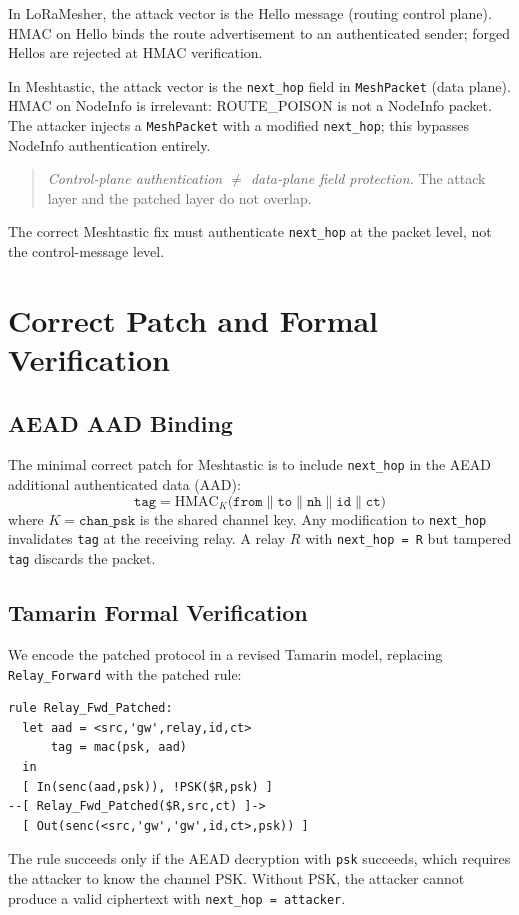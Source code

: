 \documentclass[journal]{IEEEtran}
\begin{document}
In LoRaMesher, the attack vector is the Hello message (routing control plane).
HMAC on Hello binds the route advertisement to an authenticated sender;
forged Hellos are rejected at HMAC verification.

In Meshtastic, the attack vector is the \texttt{next\_hop} field in
\texttt{MeshPacket} (data plane). HMAC on NodeInfo is irrelevant:
ROUTE\_POISON is not a NodeInfo packet. The attacker injects a
\texttt{MeshPacket} with a modified \texttt{next\_hop}; this bypasses
NodeInfo authentication entirely.

\begin{quote}
\textit{Control-plane authentication $\neq$ data-plane field protection.}
The attack layer and the patched layer do not overlap.
\end{quote}

The correct Meshtastic fix must authenticate \texttt{next\_hop} at the packet
level, not the control-message level.

\section{Correct Patch and Formal Verification}
\label{sec:patch}

\subsection{AEAD AAD Binding}

The minimal correct patch for Meshtastic is to include \texttt{next\_hop}
in the AEAD additional authenticated data (AAD):
%
\begin{equation}
  \texttt{tag} = \mathrm{HMAC}_{K}\!\bigl(
    \texttt{from} \| \texttt{to} \| \texttt{nh} \|
    \texttt{id} \| \texttt{ct}\bigr)
  \label{eq:aead-patch}
\end{equation}
where $K = \texttt{chan\_psk}$ is the shared channel key.
%
Any modification to \texttt{next\_hop} invalidates \texttt{tag} at the
receiving relay. A relay $R$ with \texttt{next\_hop = R} but
tampered \texttt{tag} discards the packet.

\subsection{Tamarin Formal Verification}

We encode the patched protocol in a revised Tamarin model,
replacing \texttt{Relay\_Forward} with the patched rule:
%
\begin{lstlisting}[caption={Patched relay rule (Tamarin, simplified)},xleftmargin=0pt,xrightmargin=0pt]
rule Relay_Fwd_Patched:
  let aad = <src,'gw',relay,id,ct>
      tag = mac(psk, aad)
  in
  [ In(senc(aad,psk)), !PSK($R,psk) ]
--[ Relay_Fwd_Patched($R,src,ct) ]->
  [ Out(senc(<src,'gw','gw',id,ct>,psk)) ]
\end{lstlisting}
%
The rule succeeds only if the AEAD decryption with \texttt{psk} succeeds,
which requires the attacker to know the channel PSK. Without PSK, the
attacker cannot produce a valid ciphertext with \texttt{next\_hop = attacker}.
\end{document}

